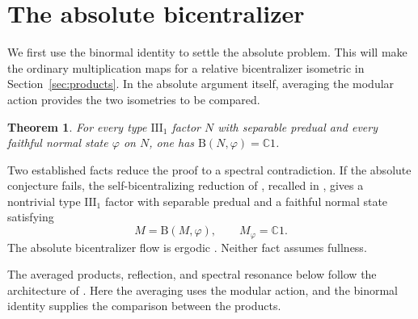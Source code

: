 \documentclass[11pt]{article}
\newtheorem{theorem}{Theorem}[section]
\theoremstyle{definition}
\newcommand{\B}{\mathrm B}
\newcommand{\C}{\mathbb C}
\begin{document}
\section{The absolute bicentralizer}\label{sec:absolute}
We first use the binormal identity to settle the absolute problem. This will
make the ordinary multiplication maps for a relative bicentralizer isometric
in Section~\ref{sec:products}. In the absolute argument itself, averaging the
modular action provides the two isometries to be compared.

\begin{theorem}\label{thm:absolute}
For every type $\mathrm{III}_1$ factor $N$ with separable predual and every
faithful normal state $\varphi$ on $N$, one has $\B(N,\varphi)=\C1$.
\end{theorem}
Two established facts reduce the proof to a spectral contradiction. If the
absolute conjecture fails, the self-bicentralizing reduction of
\cite[Proposition~3.4 and Theorem~3.5]{HI2017}, recalled in \cite{AHHM},
gives a nontrivial type $\mathrm{III}_1$ factor with separable predual and a
faithful normal state satisfying
\begin{equation}\label{eq:self}
 M=\B(M,\varphi),\qquad M_\varphi=\C1.
\end{equation}
The absolute bicentralizer flow is ergodic
\cite[Theorem~D]{M0}. Neither fact assumes fullness.

The averaged products, reflection, and spectral resonance below follow the
architecture of \cite[Propositions~8.8--8.10]{HoudayerMarrakchi2026}. Here the
averaging uses the modular action, and the binormal identity supplies the
comparison between the products.
\end{document}
